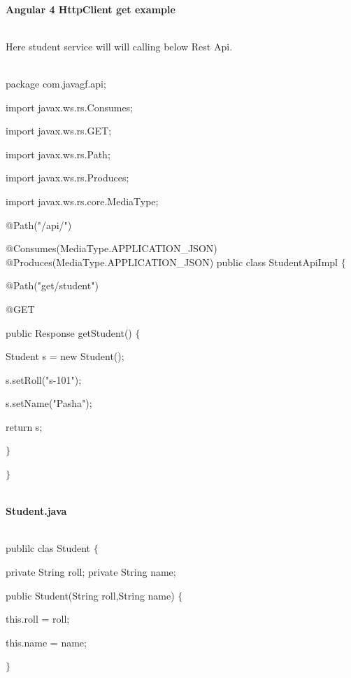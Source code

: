 \documentclass{article}
\begin{document}

\noindent \\ \textbf{Angular 4 HttpClient get example}

\noindent 

\noindent \\ Here student service will will calling below Rest Api.

\noindent 

\noindent \\ package com.javagf.api;

\noindent import javax.ws.rs.Consumes; 

\noindent import javax.ws.rs.GET; 

\noindent import javax.ws.rs.Path; 

\noindent import javax.ws.rs.Produces;

\noindent import javax.ws.rs.core.MediaType;

\noindent  

\noindent @Path("/api/") 

\noindent @Consumes(MediaType.APPLICATION\_JSON) @Produces(MediaType.APPLICATION\_JSON) public class StudentApiImpl $\mathrm{\{}$

\noindent @Path("get/student") 

\noindent @GET

\noindent public Response getStudent() $\mathrm{\{}$

\noindent Student s = new Student();

\noindent s.setRoll("s-101");

\noindent s.setName("Pasha"); 

\noindent return s;

\noindent $\mathrm{\}}$

\noindent $\mathrm{\}}$

\noindent 

\noindent \\ \textbf{Student.java}

\noindent \\ publilc clas Student $\mathrm{\{}$

\noindent private String roll; private String name;

\noindent public Student(String roll,String name) $\mathrm{\{}$

\noindent this.roll = roll;

\noindent this.name = name;

\noindent $\mathrm{\}}$
\end{document}
